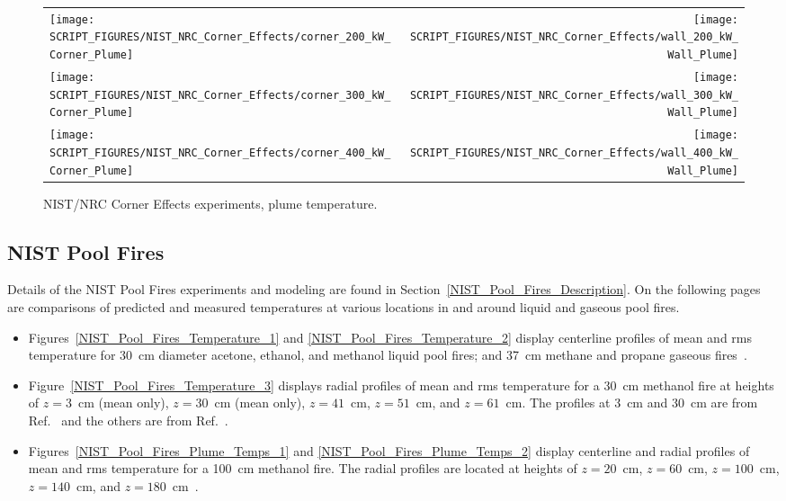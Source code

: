 \begin{figure}[!h]
\begin{tabular*}{\textwidth}{l@{\extracolsep{\fill}}r}
\texttt{[image: SCRIPT\_FIGURES/NIST\_NRC\_Corner\_Effects/corner\_200\_kW\_Corner\_Plume]} &
\texttt{[image: SCRIPT\_FIGURES/NIST\_NRC\_Corner\_Effects/wall\_200\_kW\_Wall\_Plume]} \\
\texttt{[image: SCRIPT\_FIGURES/NIST\_NRC\_Corner\_Effects/corner\_300\_kW\_Corner\_Plume]} &
\texttt{[image: SCRIPT\_FIGURES/NIST\_NRC\_Corner\_Effects/wall\_300\_kW\_Wall\_Plume]} \\
\texttt{[image: SCRIPT\_FIGURES/NIST\_NRC\_Corner\_Effects/corner\_400\_kW\_Corner\_Plume]} &
\texttt{[image: SCRIPT\_FIGURES/NIST\_NRC\_Corner\_Effects/wall\_400\_kW\_Wall\_Plume]}
\end{tabular*}
\caption[NIST/NRC Corner Effects experiments, plume temperature]
{NIST/NRC Corner Effects experiments, plume temperature.}
\label{NIST_NRC_Corner_Plume_Temp}
\end{figure}


\clearpage

\subsection{NIST Pool Fires}
\label{NIST_Pool_Fires_Plume_Temps}

Details of the NIST Pool Fires experiments and modeling are found in Section~\ref{NIST_Pool_Fires_Description}. On the following pages are comparisons of predicted and measured temperatures at various locations in and around liquid and gaseous pool fires. 
\begin{itemize}
\item Figures~\ref{NIST_Pool_Fires_Temperature_1} and \ref{NIST_Pool_Fires_Temperature_2} display centerline profiles of mean and rms temperature for 30~cm diameter acetone, ethanol, and methanol liquid pool fires; and 37~cm methane and propane gaseous fires~\cite{Falkenstein-Smith:2019}. 
\item Figure~\ref{NIST_Pool_Fires_Temperature_3} displays radial profiles of mean and rms temperature for a 30~cm methanol fire at heights of $z=3$~cm (mean only), $z=30$~cm (mean only), $z=41$~cm, $z=51$~cm, and $z=61$~cm. The profiles at 3~cm and 30~cm are from Ref.~\cite{Hamins:TN1928} and the others are from Ref.~\cite{Sung:TN2021}. 
\item Figures~\ref{NIST_Pool_Fires_Plume_Temps_1} and \ref{NIST_Pool_Fires_Plume_Temps_2} display centerline and radial profiles of mean and rms temperature for a 100~cm methanol fire. The radial profiles are located at heights of $z=20$~cm, $z=60$~cm, $z=100$~cm, $z=140$~cm, and $z=180$~cm~\cite{Sung:TN2019}.
\end{itemize}

